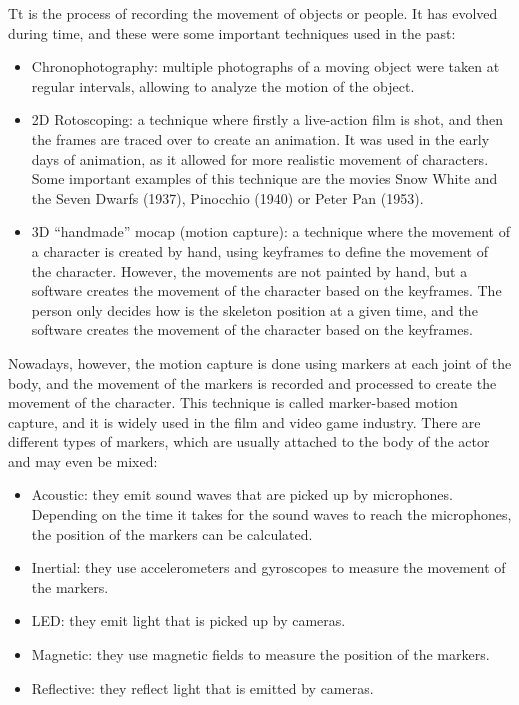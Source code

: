 Tt is the process of recording the movement of objects or people. It has evolved during time, and these were some important techniques used in the past:
\begin{itemize}
    \item Chronophotography: multiple photographs of a moving object were taken at regular intervals, allowing to analyze the motion of the object.
    \item 2D Rotoscoping: a technique where firstly a live-action film is shot, and then the frames are traced over to create an animation. It was used in the early days of animation, as it allowed for more realistic movement of characters. Some important examples of this technique are the movies Snow White and the Seven Dwarfs (1937), Pinocchio (1940) or Peter Pan (1953).
    \item 3D ``handmade'' mocap (motion capture): a technique where the movement of a character is created by hand, using keyframes to define the movement of the character. However, the movements are not painted by hand, but a software creates the movement of the character based on the keyframes. The person only decides how is the skeleton position at a given time, and the software creates the movement of the character based on the keyframes.
\end{itemize}

Nowadays, however, the motion capture is done using markers at each joint of the body, and the movement of the markers is recorded and processed to create the movement of the character. This technique is called marker-based motion capture, and it is widely used in the film and video game industry. There are different types of markers, which are usually attached to the body of the actor and may even be mixed:
\begin{itemize}
    \item Acoustic: they emit sound waves that are picked up by microphones. Depending on the time it takes for the sound waves to reach the microphones, the position of the markers can be calculated.
    \item Inertial: they use accelerometers and gyroscopes to measure the movement of the markers.
    \item LED: they emit light that is picked up by cameras.
    \item Magnetic: they use magnetic fields to measure the position of the markers.
    \item Reflective: they reflect light that is emitted by cameras. 
\end{itemize}



